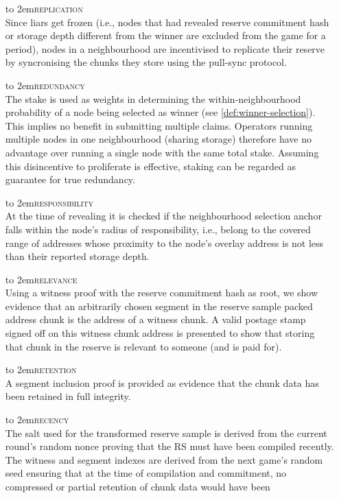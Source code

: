 \begin{itemize}[noitemsep]
%
\item[\hbox to 2em{\textsc{replication}}] \hspace{1cm}\\ Since liars get frozen (i.e., nodes that had revealed reserve commitment hash or storage depth different  from the winner are excluded from the game for a period), nodes in a neighbourhood are incentivised to replicate their reserve by syncronising the chunks they store using the pull-sync protocol.
%
\item[\hbox to 2em{\textsc{redundancy}}] \hspace{1cm}\\ The stake is used as weights in determining the within-neighbourhood probability of a node being selected as winner (see \ref{def:winner-selection}). This implies no benefit in submitting multiple claims. Operators running multiple nodes in one neighbourhood (sharing storage) therefore have no advantage over running a single node with the same total stake. Assuming this disincentive to proliferate is effective, staking can be regarded as guarantee for true redundancy.
%
\item[\hbox to 2em{\textsc{responsibility}}] \hspace{1cm}\\  At the time of revealing it is checked if the neighbourhood selection anchor falls within the node's radius of responsibility, i.e., belong to the covered range of addresses whose proximity to the node's overlay address is not less than their reported storage depth. 
%
\item[\hbox to 2em{\textsc{relevance}}] \hspace{1cm}\\ Using a witness proof with the reserve commitment hash as root, we show evidence that an arbitrarily chosen segment in the reserve sample packed address chunk is the address of a witness chunk. 
A valid postage stamp signed off on this witness chunk address is presented to show that storing that chunk  in the reserve is relevant to someone (and is paid for). 
\item[\hbox to 2em{\textsc{retention}}] \hspace{1cm}\\ A segment inclusion proof is provided as evidence that the chunk data has been retained in full integrity. 
\item[\hbox to 2em{\textsc{recency}}] \hspace{1cm}\\ The salt used for the transformed reserve sample is derived from the current round's random nonce proving that the RS must have been compiled recently. The witness and segment indexes are derived from the next game's random seed ensuring that at the time of compilation and commitment, no compressed or partial retention of chunk data would have been

\end{itemize}

